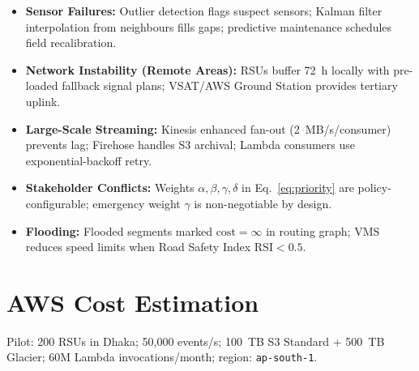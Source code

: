 \documentclass[11pt,a4paper]{article}
\begin{document}
\begin{itemize}
  \item \textbf{Sensor Failures:} Outlier detection flags suspect sensors; Kalman filter interpolation from neighbours fills gaps; predictive maintenance schedules field recalibration.
  \item \textbf{Network Instability (Remote Areas):} RSUs buffer 72~h locally with pre-loaded fallback signal plans; VSAT/AWS Ground Station provides tertiary uplink.
  \item \textbf{Large-Scale Streaming:} Kinesis enhanced fan-out (2~MB/s/consumer) prevents lag; Firehose handles S3 archival; Lambda consumers use exponential-backoff retry.
  \item \textbf{Stakeholder Conflicts:} Weights $\alpha,\beta,\gamma,\delta$ in Eq.~\ref{eq:priority} are policy-configurable; emergency weight $\gamma$ is non-negotiable by design.
  \item \textbf{Flooding:} Flooded segments marked $\text{cost}=\infty$ in routing graph; VMS reduces speed limits when Road Safety Index $\text{RSI}<0.5$.
\end{itemize}

\section{AWS Cost Estimation}

\noindent Pilot: 200 RSUs in Dhaka; 50,000 events/s; 100~TB S3 Standard + 500~TB Glacier; 60M Lambda invocations/month; region: \texttt{ap-south-1}.
\end{document}
